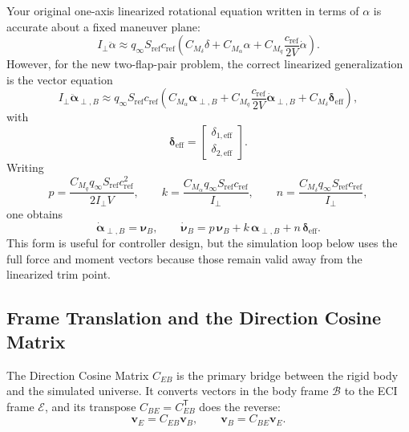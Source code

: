 Your original one-axis linearized rotational equation written in terms of \(\alpha\) is accurate about a fixed maneuver plane:
\[
I_\perp \ddot{\alpha}
\approx
q_\infty S_{\mathrm{ref}} c_{\mathrm{ref}}
\left(
C_{M_\delta}\delta
+
C_{M_\alpha}\alpha
+
C_{M_q}\frac{c_{\mathrm{ref}}}{2V}\dot{\alpha}
\right).
\]
However, for the new two-flap-pair problem, the correct linearized generalization is the vector equation
\begin{equation}
I_\perp \ddot{\boldsymbol\alpha}_{\perp,B}
\approx
q_\infty S_{\mathrm{ref}} c_{\mathrm{ref}}
\left(
C_{M_\alpha}\boldsymbol\alpha_{\perp,B}
+
C_{M_q}\frac{c_{\mathrm{ref}}}{2V}\dot{\boldsymbol\alpha}_{\perp,B}
+
C_{M_\delta}\boldsymbol\delta_{\mathrm{eff}}
\right), \label{eq:linear_pitch_vector}
\end{equation}
with
\begin{equation}
\boldsymbol\delta_{\mathrm{eff}}
=
\begin{bmatrix}
\delta_{1,\mathrm{eff}}\\[2pt]\delta_{2,\mathrm{eff}}
\end{bmatrix}.
\end{equation}
Writing
\[
p=\frac{C_{M_q}q_\infty S_{\mathrm{ref}}c_{\mathrm{ref}}^2}{2I_\perp V},
\qquad
k=\frac{C_{M_\alpha}q_\infty S_{\mathrm{ref}}c_{\mathrm{ref}}}{I_\perp},
\qquad
n=\frac{C_{M_\delta}q_\infty S_{\mathrm{ref}}c_{\mathrm{ref}}}{I_\perp},
\]
one obtains
\begin{equation}
\dot{\boldsymbol\alpha}_{\perp,B}=\boldsymbol\nu_B,
\qquad
\dot{\boldsymbol\nu}_B
=
p\,\boldsymbol\nu_B
+
k\,\boldsymbol\alpha_{\perp,B}
+
n\,\boldsymbol\delta_{\mathrm{eff}}.
\end{equation}
This form is useful for controller design, but the simulation loop below uses the full force and moment vectors because those remain valid away from the linearized trim point.

\subsection{Frame Translation and the Direction Cosine Matrix}\label{sec:frametrans}

The Direction Cosine Matrix \(C_{EB}\) is the primary bridge between the rigid body and the simulated universe. It converts vectors in the body frame \(\mathcal{B}\) to the ECI frame \(\mathcal{E}\), and its transpose \(C_{BE} = C_{EB}^{\mathsf T}\) does the reverse:
\begin{equation}
\mathbf v_E=C_{EB}\mathbf v_B,
\qquad
\mathbf v_B=C_{BE}\mathbf v_E.
\end{equation}


